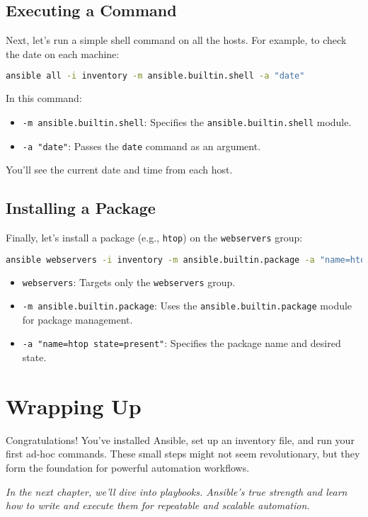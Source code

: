 \subsection{Executing a Command}

Next, let's run a simple shell command on all the hosts. For example, to check the date on each machine:
\begin{lstlisting}[language=bash, caption=Run Shell Command with Ansible]
ansible all -i inventory -m ansible.builtin.shell -a "date"
\end{lstlisting}

In this command:
\begin{itemize}
    \item \texttt{-m ansible.builtin.shell}: Specifies the \texttt{ansible.builtin.shell} module.
    \item \texttt{-a "date"}: Passes the \texttt{date} command as an argument.
\end{itemize}

You'll see the current date and time from each host.

\subsection{Installing a Package}

Finally, let's install a package (e.g., \texttt{htop}) on the \texttt{webservers} group:
\begin{lstlisting}[language=bash, caption=Install a Package]
ansible webservers -i inventory -m ansible.builtin.package -a "name=htop state=present"
\end{lstlisting}

\begin{itemize}
    \item \texttt{webservers}: Targets only the \texttt{webservers} group.
    \item \texttt{-m ansible.builtin.package}: Uses the \texttt{ansible.builtin.package} module for package management.
    \item \texttt{-a "name=htop state=present"}: Specifies the package name and desired state.
\end{itemize}

\section{Wrapping Up}

Congratulations! You've installed Ansible, set up an inventory file, and run your first ad-hoc commands. These small steps might not seem revolutionary, but they form the foundation for powerful automation workflows.

\vspace{1em}

\textit{In the next chapter, we'll dive into playbooks. Ansible's true strength and learn how to write and execute them for repeatable and scalable automation.}
